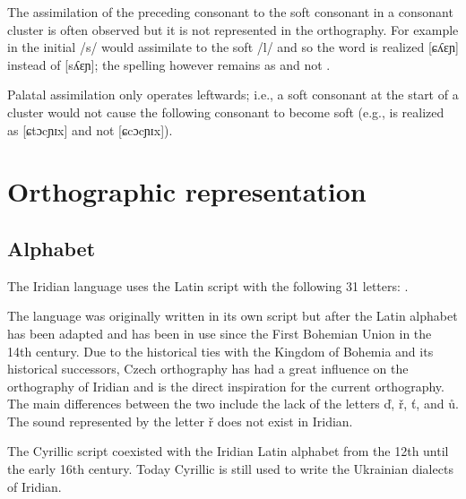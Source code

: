 The assimilation of the preceding consonant to the soft consonant in a consonant
cluster is often observed but it is not represented in the orthography. For
example in  the initial /s/ would assimilate to the soft /l/
and so the word is realized [ɕʎɛɲ] instead of [sʎɛɲ]; the spelling however
remains as  and not .

Palatal assimilation only operates leftwards; i.e., a soft consonant at the
start of a cluster would not cause the following consonant to become soft (e.g.,
 is realized as [ɕtɔcɲɪx] and not [ɕcɔcɲɪx]). 


\section{Orthographic representation}\label{sec:ortho}
\subsection{Alphabet}

The Iridian language uses the Latin script with the following 31 letters:
.

The language was originally written in its own script but after the Latin
alphabet has been adapted and has been in use since the First Bohemian Union in
the 14th century. Due to the historical ties with the Kingdom of Bohemia and its
historical successors, Czech orthography has had a great influence on the
orthography of Iridian and is the direct inspiration for the current
orthography. The main differences between the two include the lack of the
letters ď, ř, ť, and ů. The sound represented by the letter
ř does not exist in Iridian.

The Cyrillic script coexisted with the Iridian Latin alphabet from the 12th
until the early 16th century. Today Cyrillic is still used to write the
Ukrainian dialects of Iridian.

